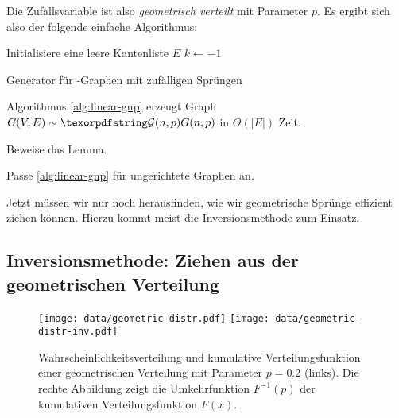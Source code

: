 \noindent Die Zufallsvariable ist also \emph{geometrisch verteilt} mit Parameter $p$.
Es ergibt sich also der folgende einfache Algorithmus:

\begin{algorithm}[H]
    Initialisiere eine leere Kantenliste $E$\;
    $k \gets -1$\;
    \caption{Generator für \Gnp-Graphen mit zufälligen Sprüngen}
    \label{alg:linear-gnp}
\end{algorithm}

\begin{lemma}
    \label{lem:linear-gnp}
    Algorithmus \ref{alg:linear-gnp} erzeugt Graph $G(V, E) \follows \Gnp$ in $\Theta(|E|)$ Zeit.
\end{lemma}

\begin{exercise}
    Beweise das Lemma.
\end{exercise}
\begin{exercise}
    Passe \cref{alg:linear-gnp} für ungerichtete Graphen an.
\end{exercise}

Jetzt müssen wir nur noch herausfinden, wie wir geometrische Sprünge effizient ziehen können.
Hierzu kommt meist die Inversionsmethode zum Einsatz.

\subsection{Inversionsmethode: Ziehen aus der geometrischen Verteilung}
\label{sec:inversionsmethode}

\begin{figure}[t]
    \begin{center}
        \texttt{[image: data/geometric-distr.pdf]}%
        \texttt{[image: data/geometric-distr-inv.pdf]}
    \end{center}

    \caption{
        Wahrscheinlichkeitsverteilung und kumulative Verteilungsfunktion einer geometrischen Verteilung mit Parameter $p = 0.2$ (links).
        Die rechte Abbildung zeigt die \glqq Umkehrfunktion\grqq{} $F^{-1}(p)$ der kumulativen Verteilungsfunktion $F(x)$.
    }
    \label{fig:geometric-distr}
\end{figure}

